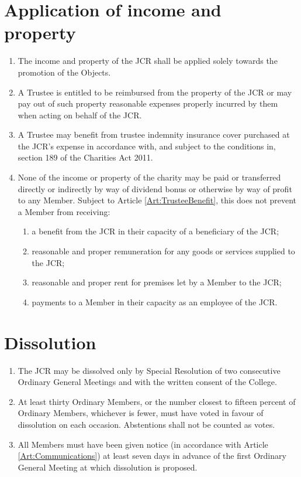 \documentclass[11pt,a4paper, oneside]{memoir}
\begin{document}
	\section{Application of income and property} \label{Art:Application}
	\begin{enumerate}
		\item The income and property of the JCR shall be applied solely towards the promotion of the Objects.
		\item A Trustee is entitled to be reimbursed from the property of the JCR or may pay out of such property reasonable expenses properly incurred by them when acting on behalf of the JCR.
		\item A Trustee may benefit from trustee indemnity insurance cover purchased at the JCR's expense in accordance with, and subject to the conditions in, section 189 of the Charities Act 2011.
		\item None of the income or property of the charity may be paid or transferred directly or indirectly by way of dividend bonus or otherwise by way of profit to any Member.  Subject to Article \ref{Art:TrusteeBenefit}, this does not prevent a Member from receiving:
		\begin{enumerate}
			\item a benefit from the JCR in their capacity of a beneficiary of the JCR;
			\item reasonable and proper remuneration for any goods or services supplied to the JCR;
			\item reasonable and proper rent for premises let by a Member to the JCR;
			\item payments to a Member in their capacity as an employee of the JCR.
		\end{enumerate}
	\end{enumerate}
	\section{Dissolution}
	\begin{enumerate}
		\item The JCR may be dissolved only by Special Resolution of two consecutive Ordinary General Meetings and with the written consent of the College.
		\item At least thirty Ordinary Members, or the number closest to fifteen percent of Ordinary Members, whichever is fewer, must have voted in favour of dissolution on each occasion.  Abstentions shall not be counted as votes.
		\item All Members must have been given notice (in accordance with Article \ref{Art:Communications}) at least seven days in advance of the first Ordinary General Meeting at which dissolution is proposed.
	\end{enumerate}
\end{document}
